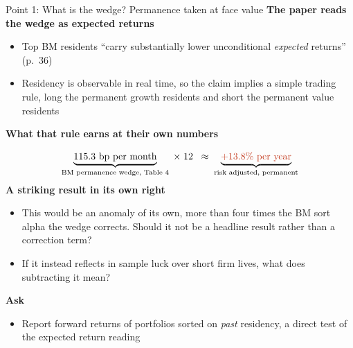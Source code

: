 \documentclass[aspectratio=169,10pt]{beamer}
\def\hibl{\textcolor{goetheblue}}
\newcommand{\svs}{\vspace{0.18cm}}
\newcommand{\bit}{\begin{itemize}}
\newcommand{\eit}{\end{itemize}}
\newcommand{\beq}{\begin{equation*}}
\newcommand{\eeq}{\end{equation*}}
\newcommand{\lead}[1]{{\bfseries #1}\par\nopagebreak}
\begin{document}
\begin{frame}{Point 1: What is the wedge? Permanence taken at face value}
\lead{The paper reads the wedge as expected returns}
\bit\itemsep2pt
  \item Top BM residents ``carry substantially lower unconditional \emph{expected} returns'' (p.~36)
  \item Residency is \hibl{observable in real time}, so the claim implies a simple trading rule, long the permanent growth residents and short the permanent value residents
\eit
\svs
\lead{What that rule earns at their own numbers}
\beq
\underbrace{115.3\ \text{bp per month}}_{\text{BM permanence wedge, Table 4}} \;\times\; 12
\;\;\approx\; \underbrace{\textcolor{accentred}{+13.8\%\ \text{per year}}}_{\text{risk adjusted, permanent}}
\eeq
\svs
\lead{A striking result in its own right}
\bit\itemsep2pt
  \item This would be an \hibl{anomaly of its own}, more than four times the BM sort alpha the wedge corrects. Should it not be a headline result rather than a correction term?
  \item If it instead reflects in sample luck over short firm lives, what does subtracting it mean?
\eit
\svs
\lead{Ask}
\bit\itemsep2pt
  \item Report forward returns of portfolios sorted on \emph{past} residency, a direct test of the expected return reading
\eit
\end{frame}
\end{document}
